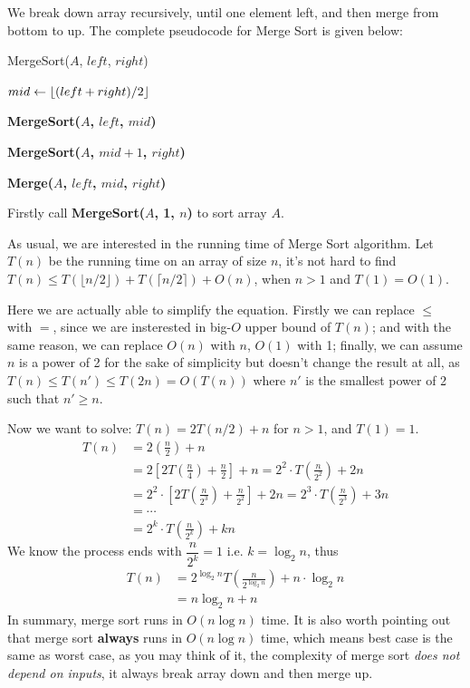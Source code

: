 \documentclass[11pt, a4paper]{COMP3711}
\begin{document}
\begin{spacing}{1.5}
    We break down array recursively, until one element left,
    and then merge from bottom to up.
    The complete pseudocode for Merge Sort is given below:
    \begin{algorithm}
        \caption{MergeSort($A$, $left$, $right$)}
        $mid\leftarrow \lfloor (left + right) / 2 \rfloor$


        {\bf MergeSort($A$, $left$, $mid$)}

        {\bf MergeSort($A$, $mid+1$, $right$)}


        {\bf Merge($A$, $left$, $mid$, $right$)}
    \end{algorithm}

    Firstly call {\bf MergeSort($A$, 1, $n$)} to sort array $A$.
    
    As usual, we are interested in the running time of Merge Sort 
    algorithm. Let $T(n)$ be the running time on an array of size $n$,
    it's not hard to find 
    $T(n)\le T(\lfloor n/2 \rfloor) + T(\lceil n/2 \rceil)+O(n)$,
    when $n>1$ and $T(1)=O(1)$.

    Here we are actually able to simplify the equation. Firstly 
    we can replace $\le $ with $=$, since we are insterested
    in big-$O$ upper bound of $T(n)$; and with the same 
    reason, we can replace $O(n)$ with $n$, $O(1)$ with 1;
    finally, we can assume $n$ is a power of 2 for the sake of 
    simplicity but doesn't change the result at all, as 
    $T(n)\le T(n')\le T(2n)=O(T(n))$ where $n'$ is the 
    smallest power of 2 such that $n'\ge n$.

    Now we want to solve: 
    $T(n)=2T(n/2)+n$ for $n>1$, and $T(1)=1$.
    \begin{align*}
        T(n) &= 2\left(\frac{n}{2}\right)+n\\
             &= 2\left[ 2T\left(\frac{n}{4}\right) +\frac{n}{2}\right] + n
              = 2^2\cdot T\left(\frac{n}{2^2}\right) +2n\\
             &= 2^2\cdot \left[ 2T\left(\frac{n}{2^3}\right) +\frac{n}{2^2}\right] + 2n
              = 2^3\cdot T\left(\frac{n}{2^3}\right) +3n\\
             &= \cdots\\
             &= 2^{k}\cdot T\left(\frac{n}{2^k}\right) +kn
    \end{align*}
    We know the process ends with $\dfrac{n}{2^k}=1$ i.e. $k=\log_2 n$, thus
    \begin{align*}
        T(n) &= 2^{\log_2 n}T\left(\frac{n}{2^{\log_2 n}}\right)+n\cdot \log_2 n\\
             &= n\log_2 n+n
    \end{align*}
    In summary, merge sort runs in $O(n\log n)$ time.
    It is also worth pointing out that merge sort {\bf always}
    runs in $O(n\log n)$ time, which means best case is the same 
    as worst case, as you may think of it, 
    the complexity of merge sort {\it does not depend on inputs},
    it always break array down and then merge up.


\end{spacing}
\end{document}
